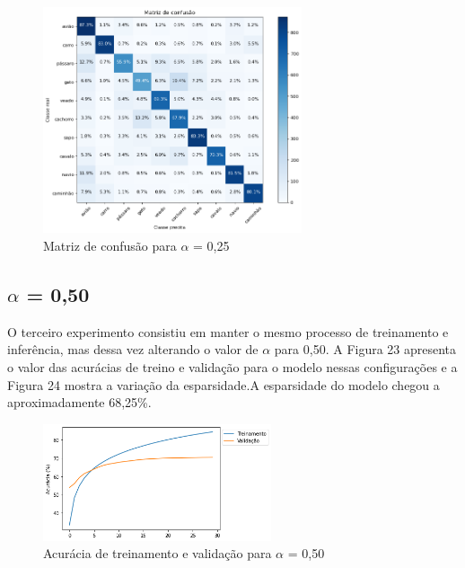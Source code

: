 \begin{figure}[H]
	\includegraphics[width=0.68\textwidth, keepaspectratio=true]{figuras/CAP4/cm_025_.png}
	\centering
	\caption[Matriz de confusão para $\alpha$ = 0,25]{Matriz de confusão para $\alpha$ = 0,25}
\end{figure}


\subsection{$\alpha$ = 0,50}
O terceiro experimento consistiu em manter o mesmo processo de treinamento e inferência, mas dessa vez alterando o valor de $\alpha$ para 0,50. A Figura 23 apresenta o valor das acurácias de treino e validação para o modelo nessas configurações e a Figura 24 mostra a variação da esparsidade.A esparsidade do modelo chegou a aproximadamente 68,25\%.






\begin{figure}[H]
	\includegraphics[width=0.6\textwidth, keepaspectratio=true]{figuras/CAP4/acuracia05.png}
	\centering
	\caption[Acurácia de treinamento e validação para $\alpha$ = 0,50]{Acurácia de treinamento e validação para $\alpha$ = 0,50}
\end{figure}

